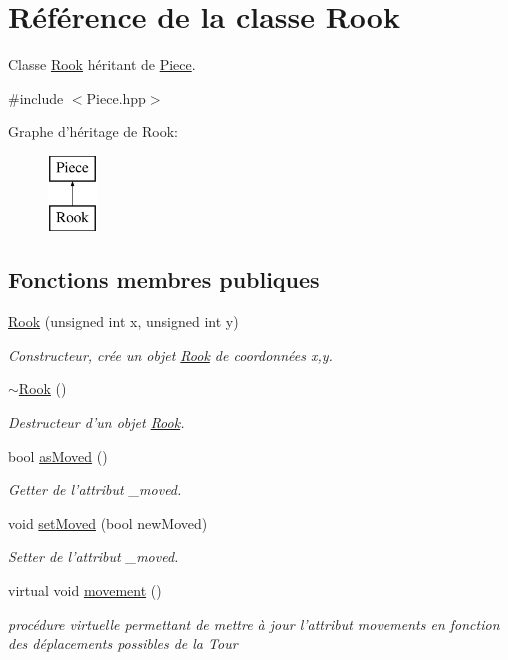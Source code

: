 \hypertarget{class_rook}{\section{Référence de la classe Rook}
\label{class_rook}
}


Classe \hyperlink{class_rook}{Rook} héritant de \hyperlink{class_piece}{Piece}.  




{\ttfamily \#include $<$Piece.\-hpp$>$}

Graphe d'héritage de Rook\-:\begin{figure}[H]
\begin{center}
\leavevmode
\includegraphics[height=2.000000cm]{class_rook}
\end{center}
\end{figure}
\subsection*{Fonctions membres publiques}
\begin{DoxyCompactItemize}
\item 
\hyperlink{class_rook_ab9613a93abc8a73bda94c596868ec1b1}{Rook} (unsigned int x, unsigned int y)
\begin{DoxyCompactList}\small\item\em Constructeur, crée un objet \hyperlink{class_rook}{Rook} de coordonnées x,y. \end{DoxyCompactList}\item 
\hyperlink{class_rook_a70d445b94848b22ded850b6f58bc2972}{$\sim$\-Rook} ()
\begin{DoxyCompactList}\small\item\em Destructeur d'un objet \hyperlink{class_rook}{Rook}. \end{DoxyCompactList}\item 
bool \hyperlink{class_rook_afb50e8a85759ba7518b55dace6b6e406}{as\-Moved} ()
\begin{DoxyCompactList}\small\item\em Getter de l'attribut \-\_\-moved. \end{DoxyCompactList}\item 
void \hyperlink{class_rook_a7ee5b6169a3fff6d5536ba0c02607950}{set\-Moved} (bool new\-Moved)
\begin{DoxyCompactList}\small\item\em Setter de l'attribut \-\_\-moved. \end{DoxyCompactList}\item 
virtual void \hyperlink{class_rook_acc6139577c8ca679a93dcfbe42b71cb3}{movement} ()
\begin{DoxyCompactList}\small\item\em procédure virtuelle permettant de mettre à jour l'attribut movements en fonction des déplacements possibles de la Tour \end{DoxyCompactList}\end{DoxyCompactItemize}
